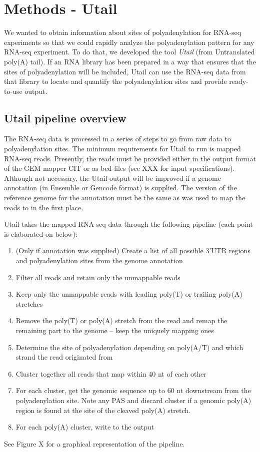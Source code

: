 %

\section{Methods - Utail}
We wanted to obtain information about sites of polyadenylation for RNA-seq
experiments so that we could rapidly analyze the polyadenylation pattern for
any RNA-seq experiment. To do that, we developed the tool \textit{Utail} (from
Untranslated poly(A) tail). If an RNA library has been prepared in a way that
ensures that the sites of polyadenylation will be included, Utail can use the
RNA-seq data from that library to locate and quantify the polyadenylation sites
and provide ready-to-use output.

\subsection{Utail pipeline overview}
The RNA-seq data is processed in a series of steps to go from raw data to
polyadenylation sites. The minimum requirements for Utail to run is mapped
RNA-seq reads. Presently, the reads must be provided either in the output
format of the GEM mapper CIT or as bed-files (see XXX for input
specifications). Although not necessary, the Utail output will be improved if a
genome annotation (in Ensemble or Gencode format) is supplied. The version of
the reference genome for the annotation must be the same as was used to map the
reads to in the first place.

Utail takes the mapped RNA-seq data through the following pipeline (each point
is elaborated on below):
\begin{enumerate}
	\item (Only if annotation was supplied) Create a list of all possible
		3'UTR regions and polyadenylation sites from the genome annotation
	\item Filter all reads and retain only the unmappable reads
	\item Keep only the unmappable reads with leading poly(T) or trailing
		poly(A) stretches
	\item Remove the poly(T) or poly(A) stretch from the read and remap the
		remaining part to the genome -- keep the uniquely mapping ones
	\item Determine the site of polyadenylation depending on poly(A/T) and which
		strand the read originated from
	\item Cluster together all reads that map within 40 nt of each other
	\item For each cluster, get the genomic sequence up to 60 nt downstream
		from the polyadenylation site. Note any PAS and discard cluster if a
		genomic poly(A) region is found at the site of the cleaved poly(A)
		stretch.
	\item For each poly(A) cluster, write to the output
\end{enumerate}
See Figure X for a graphical representation of the pipeline.

